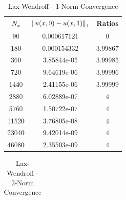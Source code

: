 \documentclass[12pt]{article}
\begin{document}
\begin{enumerate}[(a)]
\begin{minipage}{0.5\textwidth}
\begin{table}[H]
\caption{Lax-Wendroff - 1-Norm Convergence}
\centering\begin{tabular}{||c|cc||}
\hline \hline
    $N_x$ & $\norm{u(x,0)-u(x,1)}_1$ &  Ratios \\
\hline
    90 &    0.000617121 &  0       \\
   180 &    0.000154332 &  3.99867 \\
   360 &    3.85844e-05 &  3.99985 \\
   720 &    9.64619e-06 &  3.99996 \\
  1440 &    2.41155e-06 &  3.99999 \\
  2880 &    6.02889e-07 &  4       \\
  5760 &    1.50722e-07 &  4       \\
 11520 &    3.76805e-08 &  4       \\
 23040 &    9.42014e-09 &  4       \\
 46080 &    2.35503e-09 &  4       \\
\hline \hline
\end{tabular}
\end{table}
\end{minipage}
\begin{minipage}{0.5\textwidth}
\begin{table}[H]
\caption{Lax-Wendroff - 2-Norm Convergence}
\centering\begin{tabular}{||c|cc||}

\end{tabular}
\end{table}
\end{minipage}
\end{enumerate}
\end{document}
